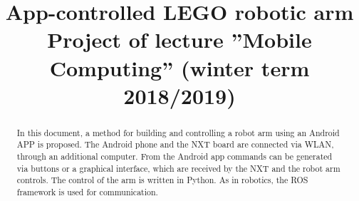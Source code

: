\documentclass[conference]{IEEEtran}
\begin{document}
\title{App-controlled LEGO robotic arm\\
{\footnotesize Project of lecture ''Mobile Computing'' (winter term 2018/2019)}
}

\author{
\and
{}
}

\maketitle

\begin{abstract}
In this document, a method for building and controlling a robot arm using an Android APP is proposed. The Android phone and the NXT board are connected via WLAN, through an additional computer. From the Android app commands can be generated via buttons or a graphical interface, which are received by the NXT and the robot arm controls. The control of the arm is written in Python. As in robotics, the ROS framework is used for communication.
\end{abstract}

\end{document}
